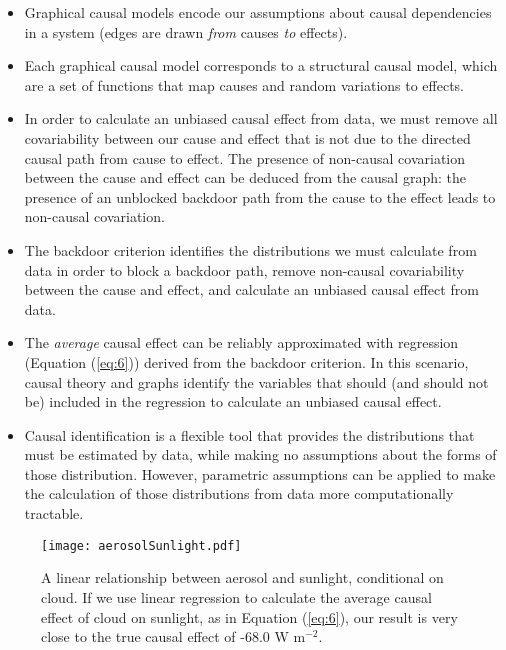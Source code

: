\documentclass[12pt]{article}
\begin{document}
\begin{itemize}
\item Graphical causal models encode our assumptions about causal
  dependencies in a system (edges are drawn \emph{from} causes
  \emph{to} effects).
\item Each graphical causal model corresponds to a structural causal
  model, which are a set of functions that map causes and random
  variations to effects.
\item In order to calculate an unbiased causal effect from data, we
  must remove all covariability between our cause and effect that is
  not due to the directed causal path from cause to effect. The
  presence of non-causal covariation between the cause and effect can
  be deduced from the causal graph: the presence of an unblocked
  backdoor path from the cause to the effect leads to non-causal
  covariation.
\item The backdoor criterion identifies the distributions we must
  calculate from data in order to block a backdoor path, remove
  non-causal covariability between the cause and effect, and
  calculate an unbiased causal effect from data.
\item The \emph{average} causal effect can be reliably approximated
  with regression (Equation (\ref{eq:6})) derived from the backdoor
  criterion. In this scenario, causal theory and graphs identify the
  variables that should (and should not be) included in the
  regression to calculate an unbiased causal effect.
\item Causal identification is a flexible tool that provides the
  distributions that must be estimated by data, while making no
  assumptions about the forms of those distribution. However,
  parametric assumptions can be applied to make the calculation of
  those distributions from data more computationally tractable.
\end{itemize}

\begin{figure}
  \texttt{[image: aerosolSunlight.pdf]}
  \caption{A linear relationship between aerosol and sunlight,
    conditional on cloud. If we use linear regression to calculate the
    average causal effect of cloud on sunlight, as in Equation
    (\ref{eq:6}), our result is very close to the true causal effect
    of -68.0 W m$^{-2}$.}
  \label{fig:linear}
\end{figure}
\end{document}
